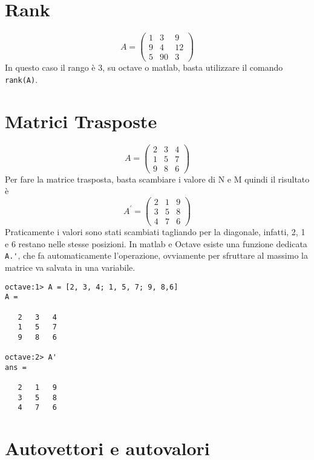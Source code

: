 \section{Rank}
\label{sec:rank}

\begin{equation*}
  A=\begin{pmatrix}
      1 & 3 & 9\\
      9 & 4 & 12\\
      5 & 90 & 3
  \end{pmatrix}
\end{equation*}
In questo caso il rango è 3, su octave o matlab, basta utilizzare il comando
\lstinline|rank(A)|.\\

\section{Matrici Trasposte}
\label{sec:matt}
\begin{equation*}
  A = \begin{pmatrix}
    2 & 3 & 4\\
    1 & 5 & 7\\
    9 & 8 & 6        
  \end{pmatrix}
\end{equation*}
Per fare la matrice trasposta, basta scambiare i valore di N e M quindi il risultato è
\begin{equation*}
  A^\prime=
  \begin{pmatrix}
    2  & 1 &  9\\
    3  & 5 &  8\\
    4  & 7 &  6
  \end{pmatrix}
\end{equation*}
Praticamente i valori sono stati scambiati tagliando per la diagonale,
infatti, 2, 1 e 6 restano nelle stesse posizioni. In matlab e Octave esiste una
funzione dedicata \lstinline|A.'|, che fa automaticamente l'operazione,
ovviamente per sfruttare al massimo la matrice va salvata in una variabile.
\begin{verbatim}
octave:1> A = [2, 3, 4; 1, 5, 7; 9, 8,6]
A =

   2   3   4
   1   5   7
   9   8   6

octave:2> A'
ans =

   2   1   9
   3   5   8
   4   7   6
\end{verbatim}

\section{Autovettori e autovalori}
\label{sec:autovettorieautovalori}

